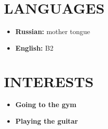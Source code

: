\documentclass[12pt]{moderncv}
\begin{document}
    \section{LANGUAGES}

        \begin{itemize}
            \item \textbf{Russian:} mother tongue
            \item \textbf{English:} B2
        \end{itemize}

    \section{INTERESTS}

        \begin{itemize}
            \item \textbf{Going to the gym}
            \item \textbf{Playing the guitar}
        \end{itemize}
\end{document}
